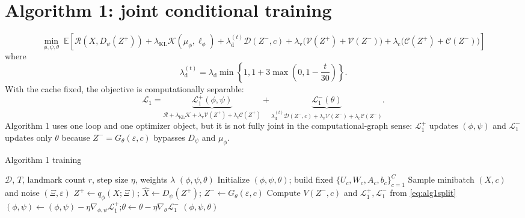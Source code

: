 \documentclass[10pt]{article}
\newcommand{\unique}[1]{\textcolor{algblue}{#1}}
\begin{document}
\section*{Algorithm 1: joint conditional training}

\begin{equation}
 \boxed{
 \min_{\phi,\psi,\theta}\;
 \mathbb E\!\left[
 \mathcal R(X,D_\psi(Z^+))
 +\lambda_{\mathrm{KL}}\mathcal K(\mu_\phi,\ell_\phi)
 +\lambda_{\mathrm d}^{(t)}\mathcal D(Z^-,c)
 +\lambda_{\mathrm v}\bigl(\mathcal V(Z^+)+\mathcal V(Z^-)\bigr)
 +\lambda_{\mathrm c}\bigl(\mathcal C(Z^+)+\mathcal C(Z^- )\bigr)
 \right]
 }
 \label{eq:alg1}
\end{equation}
\noindent
where
\[
 \lambda_{\mathrm d}^{(t)}=\lambda_{\mathrm d}
 \min\!\left\{1,1+3\max\!\left(0,1-\frac{t}{30}\right)\right\}.
\]
\noindent
\noindent
With the cache fixed, the objective is computationally separable:
\begin{equation}
 \mathcal L_1=\underbrace{\mathcal L_1^+(\phi,\psi)}_{\mathcal R+\lambda_{\mathrm{KL}}\mathcal K+\lambda_{\mathrm v}\mathcal V(Z^+)+\lambda_{\mathrm c}\mathcal C(Z^+)}
 +\underbrace{\mathcal L_1^-(\theta)}_{\lambda_{\mathrm d}^{(t)}\mathcal D(Z^-,c)+\lambda_{\mathrm v}\mathcal V(Z^-)+\lambda_{\mathrm c}\mathcal C(Z^-)}.
 \label{eq:alg1split}
\end{equation}
\unique{Algorithm 1 uses one loop and one optimizer object, but it is not fully joint in the computational-graph sense: $\mathcal L_1^+$ updates $(\phi,\psi)$ and $\mathcal L_1^-$ updates only $\theta$ because $Z^-=G_\theta(\varepsilon,c)$ bypasses $D_\psi$ and $\mu_\phi$.}

\begin{algorithm}[H]
\caption{Algorithm 1 training}
\begin{algorithmic}[1]
\Require $\mathcal D$, $T$, landmark count $r$, step size $\eta$, weights $\lambda$
\Ensure $(\phi,\psi,\theta)$
\State Initialize $(\phi,\psi,\theta)$; build fixed $\{U_c,W_c,A_c,b_c\}_{c=1}^C$
    \State Sample minibatch $(X,c)$ and noise $(\Xi,\varepsilon)$
    \State $Z^+\gets q_\phi(X;\Xi)$; $\widehat X\gets D_\psi(Z^+)$; $Z^-\gets G_\theta(\varepsilon,c)$
    \State Compute $V(Z^-,c)$ and $\mathcal L_1^+,\mathcal L_1^-$ from \eqref{eq:alg1split}
    \State $(\phi,\psi)\gets(\phi,\psi)-\eta\nabla_{\phi,\psi}\mathcal L_1^+$;\quad $\theta\gets\theta-\eta\nabla_\theta\mathcal L_1^-$
\EndFor
\State \Return $(\phi,\psi,\theta)$
\end{algorithmic}
\end{algorithm}
\end{document}
